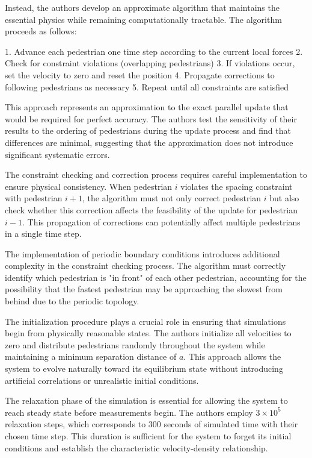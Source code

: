 \documentclass[12pt,a4paper]{article}
\begin{document}
Instead, the authors develop an approximate algorithm that maintains the essential physics while remaining computationally tractable. The algorithm proceeds as follows:

1. Advance each pedestrian one time step according to the current local forces
2. Check for constraint violations (overlapping pedestrians)
3. If violations occur, set the velocity to zero and reset the position
4. Propagate corrections to following pedestrians as necessary
5. Repeat until all constraints are satisfied

This approach represents an approximation to the exact parallel update that would be required for perfect accuracy. The authors test the sensitivity of their results to the ordering of pedestrians during the update process and find that differences are minimal, suggesting that the approximation does not introduce significant systematic errors.

The constraint checking and correction process requires careful implementation to ensure physical consistency. When pedestrian $i$ violates the spacing constraint with pedestrian $i+1$, the algorithm must not only correct pedestrian $i$ but also check whether this correction affects the feasibility of the update for pedestrian $i-1$. This propagation of corrections can potentially affect multiple pedestrians in a single time step.

The implementation of periodic boundary conditions introduces additional complexity in the constraint checking process. The algorithm must correctly identify which pedestrian is "in front" of each other pedestrian, accounting for the possibility that the fastest pedestrian may be approaching the slowest from behind due to the periodic topology.

The initialization procedure plays a crucial role in ensuring that simulations begin from physically reasonable states. The authors initialize all velocities to zero and distribute pedestrians randomly throughout the system while maintaining a minimum separation distance of $a$. This approach allows the system to evolve naturally toward its equilibrium state without introducing artificial correlations or unrealistic initial conditions.

The relaxation phase of the simulation is essential for allowing the system to reach steady state before measurements begin. The authors employ $3 \times 10^5$ relaxation steps, which corresponds to 300 seconds of simulated time with their chosen time step. This duration is sufficient for the system to forget its initial conditions and establish the characteristic velocity-density relationship.
\end{document}
